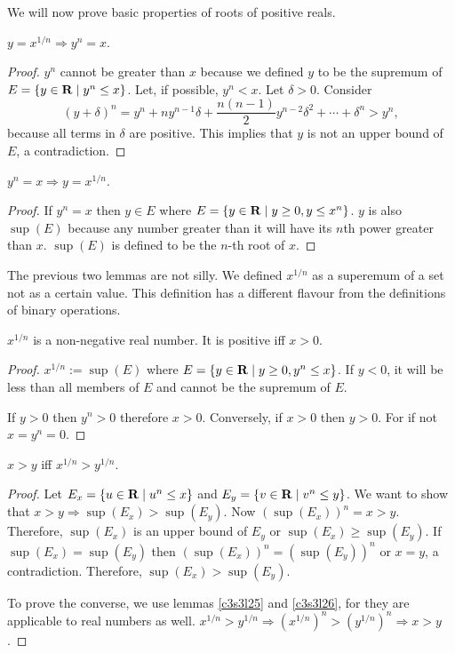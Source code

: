 We will now prove basic properties of roots of positive reals.
\begin{lem}\label{c4s6l2}
$y = x^{1/n} \Rightarrow y^n = x$.
\end{lem}
\begin{proof}
$y^n$ cannot be greater than $x$ because we defined $y$ to be the supremum
of $E = \{y \in \mathbf{R} \;|\; y^n \le x\}$. Let, if possible, $y^n < x$. Let
$\delta > 0$. Consider 
\[
(y + \delta)^n = y^n + ny^{n-1}\delta + \frac{n(n-1)}{2}y^{n-2}\delta^2
+ \cdots + \delta^n > y^n,
\]
because all terms in $\delta$ are positive. This implies that $y$ is not
an upper bound of $E$, a contradiction.
\end{proof}

\begin{lem}\label{c4s6l3}
$y^n = x \Rightarrow y = x^{1/n}$.
\end{lem}
\begin{proof}
If $y^n = x$ then $y \in E$ where $E = \{y \in \mathbf{R} \;|\; y \ge 0, y \le
x^n\}$. $y$ is also $\sup(E)$ because any number greater than it will have
its $n$th power greater than $x$. $\sup(E)$ is defined to be the $n$-th
root of $x$.
\end{proof}

The previous two lemmas are not silly. We defined $x^{1/n}$ as a superemum
of a set not as a certain value. This definition has a different flavour 
from the definitions of binary operations.

\begin{lem}\label{c4s6l4}
$x^{1/n}$ is a non-negative real number. It is positive iff $x > 0$.
\end{lem}
\begin{proof}
$x^{1/n} := \sup(E)$ where $E = \{y \in \mathbf{R} \;|\; y \ge 0, y^n \le x\}$.
If $y < 0$, it will be less than all members of $E$ and cannot be the
supremum of $E$.

If $y > 0$ then $y^n > 0$ therefore $x > 0$. Conversely, if $x > 0$ then
$y > 0$. For if not $x = y^n = 0$.
\end{proof}

\begin{lem}\label{c4s6l5}
$x > y$ iff $x^{1/n} > y^{1/n}$.
\end{lem}
\begin{proof}
Let $E_x = \{u \in \mathbf{R} \;|\; u^n \le x\}$ and $E_y = \{v \in \mathbf{R} \;|\; 
v^n \le y\}$. We want to show that $x > y \Rightarrow \sup(E_x) > 
\sup(E_y)$. Now $(\sup(E_x))^n = x > y$. Therefore, $\sup(E_x)$ is an
upper bound of $E_y$ or $\sup(E_x) \ge \sup(E_y)$. If $\sup(E_x) = 
\sup(E_y)$ then $(\sup(E_x))^n = (\sup(E_y))^n$ or $x = y$, a 
contradiction. Therefore, $\sup(E_x) > \sup(E_y)$.

To prove the converse, we use lemmas \ref{c3s3l25} and \ref{c3s3l26},
for they are applicable to real numbers as well. $x^{1/n} > y^{1/n} 
\Rightarrow (x^{1/n})^n > (y^{1/n})^n \Rightarrow x > y$.
\end{proof}

